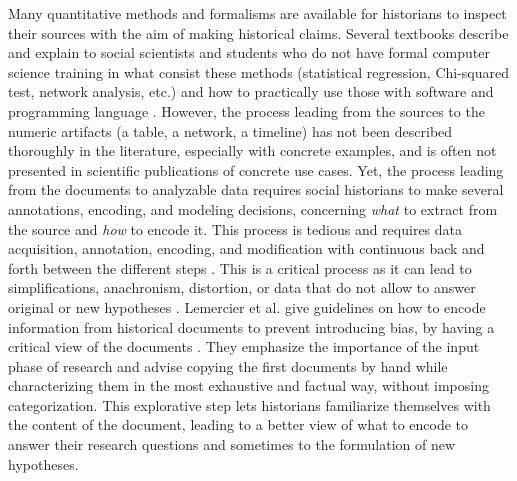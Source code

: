 Many quantitative methods and formalisms are available for historians to inspect their sources with the aim of making historical claims.
Several textbooks describe and explain to social scientists and students who do not have formal computer science training in what consist these methods (statistical regression, Chi-squared test, network analysis, etc.) and how to practically use those with software and programming language \cite{archdeaconCorrelationRegressionAnalysis1994, floudIntroductionQuantitativeMethods2013}.
However, the process leading from the sources to the numeric artifacts (a table, a network, a timeline) has not been described thoroughly in the literature, especially with concrete examples, and is often not presented in scientific publications of concrete use cases.
Yet, the process leading from the documents to analyzable data requires social historians to make several annotations, encoding, and modeling decisions, concerning \emph{what} to extract from the source and \emph{how} to encode it.
This process is tedious and requires data acquisition, annotation, encoding, and modification with continuous back and forth between the different steps \cite{alkadi2022}.
This is a critical process as it can lead to simplifications, anachronism, distortion, or data that do not allow to answer original or new hypotheses \cite{karila-cohenNouvellesCuisinesHistoire2018, lemercierQuantitativeMethodsHumanities2019}.
Lemercier et al. give guidelines on how to encode information from historical documents to prevent introducing bias, by having a critical view of the documents \cite{lemercierBackSourcesPracticing2021}.
They emphasize the importance of the input phase of research and advise copying the first documents by hand while characterizing them in the most exhaustive and factual way, without imposing categorization.
This explorative step lets historians familiarize themselves with the content of the document, leading to a better view of what to encode to answer their research questions and sometimes to the formulation of new hypotheses.
